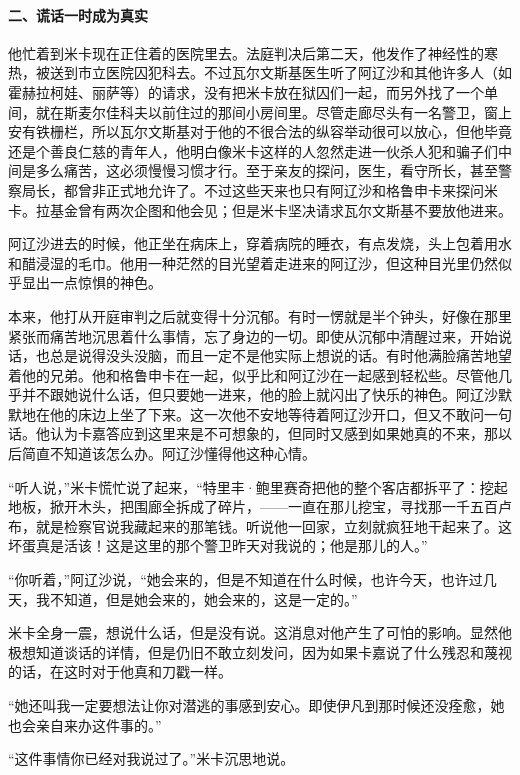 \paragraph*{二、谎话一时成为真实}
\par 他忙着到米卡现在正住着的医院里去。法庭判决后第二天，他发作了神经性的寒热，被送到市立医院囚犯科去。不过瓦尔文斯基医生听了阿辽沙和其他许多人（如霍赫拉柯娃、丽萨等）的请求，没有把米卡放在狱囚们一起，而另外找了一个单间，就在斯麦尔佳科夫以前住过的那间小房间里。尽管走廊尽头有一名警卫，窗上安有铁栅栏，所以瓦尔文斯基对于他的不很合法的纵容举动很可以放心，但他毕竟还是个善良仁慈的青年人，他明白像米卡这样的人忽然走进一伙杀人犯和骗子们中间是多么痛苦，这必须慢慢习惯才行。至于亲友的探问，医生，看守所长，甚至警察局长，都曾非正式地允许了。不过这些天来也只有阿辽沙和格鲁申卡来探问米卡。拉基金曾有两次企图和他会见；但是米卡坚决请求瓦尔文斯基不要放他进来。
\par 阿辽沙进去的时候，他正坐在病床上，穿着病院的睡衣，有点发烧，头上包着用水和醋浸湿的毛巾。他用一种茫然的目光望着走进来的阿辽沙，但这种目光里仍然似乎显出一点惊惧的神色。
\par 本来，他打从开庭审判之后就变得十分沉郁。有时一愣就是半个钟头，好像在那里紧张而痛苦地沉思着什么事情，忘了身边的一切。即使从沉郁中清醒过来，开始说话，也总是说得没头没脑，而且一定不是他实际上想说的话。有时他满脸痛苦地望着他的兄弟。他和格鲁申卡在一起，似乎比和阿辽沙在一起感到轻松些。尽管他几乎并不跟她说什么话，但只要她一进来，他的脸上就闪出了快乐的神色。阿辽沙默默地在他的床边上坐了下来。这一次他不安地等待着阿辽沙开口，但又不敢问一句话。他认为卡嘉答应到这里来是不可想象的，但同时又感到如果她真的不来，那以后简直不知道该怎么办。阿辽沙懂得他这种心情。
\par “听人说，”米卡慌忙说了起来，“特里丰·鲍里赛奇把他的整个客店都拆平了：挖起地板，掀开木头，把围廊全拆成了碎片，——一直在那儿挖宝，寻找那一千五百卢布，就是检察官说我藏起来的那笔钱。听说他一回家，立刻就疯狂地干起来了。这坏蛋真是活该！这是这里的那个警卫昨天对我说的；他是那儿的人。”
\par “你听着，”阿辽沙说，“她会来的，但是不知道在什么时候，也许今天，也许过几天，我不知道，但是她会来的，她会来的，这是一定的。”
\par 米卡全身一震，想说什么话，但是没有说。这消息对他产生了可怕的影响。显然他极想知道谈话的详情，但是仍旧不敢立刻发问，因为如果卡嘉说了什么残忍和蔑视的话，在这时对于他真和刀戳一样。
\par “她还叫我一定要想法让你对潜逃的事感到安心。即使伊凡到那时候还没痊愈，她也会亲自来办这件事的。”
\par “这件事情你已经对我说过了。”米卡沉思地说。
